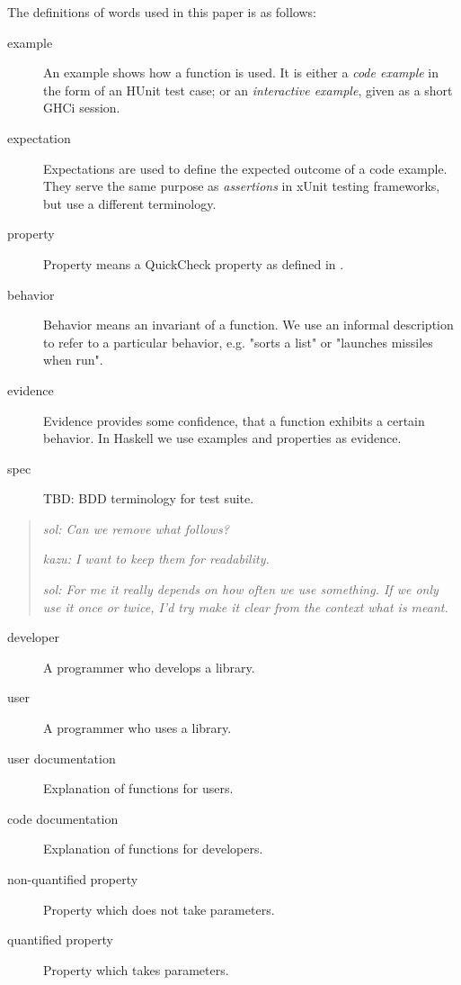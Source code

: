 \documentclass[preprint]{sigplanconf}
\begin{document}
The definitions of words used in this paper is as follows:

\begin{description}

\item[example]
    An example shows how a function is used.  It is either a \emph{code
    example} in the form of an HUnit test case; or an \emph{interactive
    example}, given as a short GHCi session.

\item[expectation]
    Expectations are used to define the expected outcome of a code
    example.  They serve the same purpose as \emph{assertions} in xUnit
    testing frameworks, but use a different terminology.

\item[property]
    Property means a QuickCheck property as defined in
    \cite{quickcheck}.

\item[behavior]
    Behavior means an invariant of a function.  We use an informal description
    to refer to a particular behavior, e.g.  "sorts a list" or "launches
    missiles when run".

\item[evidence]
    Evidence provides some confidence, that a function exhibits a
    certain behavior.  In Haskell we use examples and properties as
    evidence.

\item[spec]
    TBD: BDD terminology for test suite.
\end{description}


\begin{quote}
    \emph{sol: Can we remove what follows?}

    \emph{kazu: I want to keep them for readability.}

    \emph{sol: For me it really depends on how often we use something.
    If we only use it once or twice, I'd try make it clear from the
    context what is meant.}
\end{quote}

\begin{description}
\item[developer]
    A programmer who develops a library.

\item[user]
    A programmer who uses a library.


\item[user documentation]
    Explanation of functions for users.
\item[code documentation]
    Explanation of functions for developers.

\item[non-quantified property]
    Property which does not take parameters.

\item[quantified property]
    Property which takes parameters.

\end{description}
\end{document}
